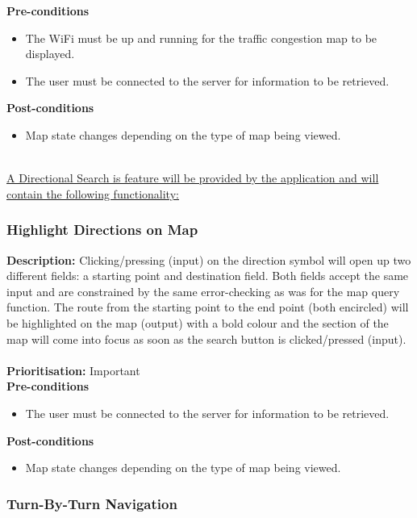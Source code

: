 \documentclass[runningheads,a4paper]{article}
\begin{document}
  
\textbf{Pre-conditions}
\begin{itemize}
 	\item The WiFi must be up and running for the traffic congestion map to be displayed.
	\item The user must be connected to the server for information to be retrieved.
\end{itemize}
  
\textbf{Post-conditions}
\begin{itemize}
  	\item Map state changes depending on the type of map being viewed.
\end{itemize}



\noindent \\ \underline{A Directional Search is feature will be provided by the application and will contain the following functionality:}


\subsubsection{Highlight Directions on Map}

\textbf{Description:}  Clicking/pressing (input) on the direction symbol will open up two different fields: a starting point and destination field. Both fields accept the same input and are constrained by the same error-checking as was for the map query function.
The route from the starting point to the end point (both encircled) will be highlighted on the map (output) with a bold colour and the section of the map will come into focus as soon as the search button is clicked/pressed (input).\\\\
\noindent
\textbf{Prioritisation:} Important\\
  
  
\textbf{Pre-conditions}
\begin{itemize}
	\item The user must be connected to the server for information to be retrieved.
\end{itemize}
  
\textbf{Post-conditions}
\begin{itemize}
  	\item Map state changes depending on the type of map being viewed.
\end{itemize}

\subsubsection{Turn-By-Turn Navigation}
\end{document}
